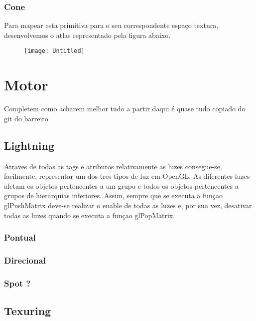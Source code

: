 \documentclass{article}
\begin{document}
\subsubsection{ Cone } 
Para mapear esta primitiva para o seu correspondente espaço textura, desenvolvemos o atlas representado pela figura abaixo.
\begin{figure}[H]
	\centering
	\texttt{[image: Untitled]}
\end{figure}

\section{Motor}
Completem como acharem melhor tudo a partir daqui é quase tudo copiado do git do barreiro
\subsection{Lightning}
Atraves de todas as tags e atributos relativamente as luzes consegue-se, facilmente, representar um dos tres tipos de luz em OpenGL.
As diferentes luzes afetam os objetos pertencentes a um grupo e todos os objetos pertencentes a grupos de hierarquias inferiores. Assim, sempre que se executa a funçao glPushMatrix deve-se realizar o enable de todas as luzes e, por sua vez, desativar todas as luzes quando se executa a funçao glPopMatrix.

\subsubsection{Pontual}

\subsubsection{Direcional}

\subsubsection{Spot ?}

\subsection{Texuring}
\end{document}
